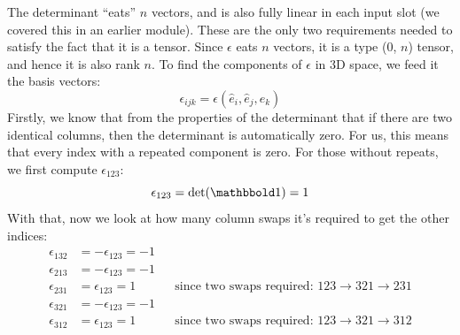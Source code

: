 \documentclass{article}
\begin{document}
\begin{solution}
	The determinant ``eats'' $n$ vectors, and is also fully linear in each input slot (we covered this in an 
	earlier module). These are the only two requirements needed to satisfy the fact that it is a tensor. Since
	$\epsilon$ eats $n$ vectors, it is a type (0, $n$) tensor, and hence it is also rank $n$. To find the 
	components of $\epsilon$ in 3D space, we feed it the basis vectors:
	\[
		\epsilon_{ijk} = \epsilon(\hat{e}_i, \hat{e}_j, \hat{e}_k)
	\] 
	Firstly, we know that from the properties of the determinant that if there are two identical columns, then
	the determinant is automatically zero. For us, this means that every index with a repeated component is 
	zero. For those without repeats, we first compute $\epsilon_{123}$:
	\[
		\epsilon_{123} = \det(\mathbbold 1) = 1
	\] 
	With that, now we look at how many column swaps it's required to get the other indices:
	\begin{align*}
		\epsilon_{132} &= -\epsilon_{123} = -1\\
		\epsilon_{213} &= -\epsilon_{123} = -1 \\
		\epsilon_{231} &= \epsilon_{123} = 1 && \text{since two swaps required: $123 \to 321 \to 231$}\\
		\epsilon_{321} &= -\epsilon_{123} = -1\\
		\epsilon_{312} &= \epsilon_{123} = 1 && \text{since two swaps required: $123 \to 321 \to 312$}
	\end{align*}
\end{solution}



\phline
\end{document}
